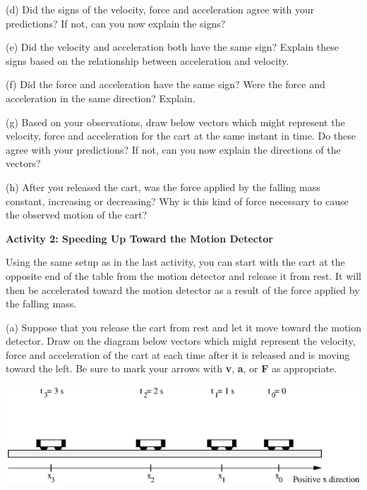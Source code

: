 (d) Did the signs of the velocity, force and acceleration agree with your predictions?
If not, can you now explain the signs?
\vspace{20mm}

(e) Did the velocity and acceleration both have the same sign? Explain these
signs based on the relationship between acceleration and velocity.
\vspace{20mm}

(f) Did the force and acceleration have the same sign? Were the force and acceleration
in the same direction? Explain.
\vspace{20mm}

(g) Based on your observations, draw below vectors which might represent the
velocity, force and acceleration for the cart at the same instant in time. Do
these agree with your predictions? If not, can you now explain the directions
of the vectors?
\vspace{20mm}

(h) After you released the cart, was the force applied by the falling mass constant,
increasing or decreasing?  Why is this kind of force necessary to cause
the observed motion of the cart?
\vspace{20mm}

\textbf{Activity 2: Speeding Up Toward the Motion Detector }

Using the same setup as in the last activity, you can start with the cart at
the opposite end of the table from the motion detector and release it from rest.
It will then be accelerated toward the motion detector as a result of the force
applied by the falling mass.

(a) Suppose that you release the cart from rest and let it move toward the motion
detector. Draw on the diagram below vectors which might represent the velocity,
force and acceleration of the cart at each time after it is released and is
moving toward the left. Be sure to mark your arrows with \textbf{v}, \textbf{a},
or \textbf{F} as appropriate.

\vspace{0.3cm}
{\par\centering \includegraphics{force2/force2_fig5.eps} \par}
\vspace{0.3cm}

